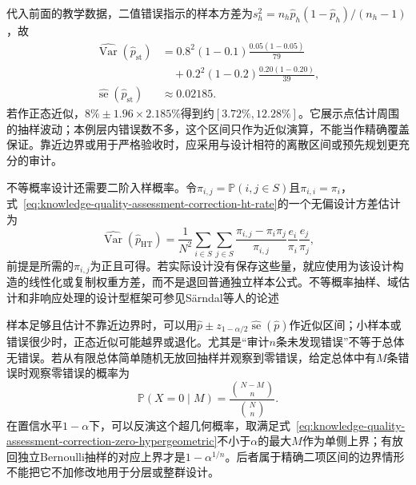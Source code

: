 代入前面的教学数据，二值错误指示的样本方差为$s_h^2=n_h\widehat p_h(1-\widehat p_h)/(n_h-1)$，故
\[
  \begin{aligned}
    \widehat{\operatorname{Var}}(\widehat p_{\mathrm{st}})
    &=
    0.8^2(1-0.1)\frac{0.05(1-0.05)}{79}\\
    &\quad+0.2^2(1-0.2)\frac{0.20(1-0.20)}{39},\\
    \widehat{\operatorname{se}}(\widehat p_{\mathrm{st}})
    &\approx 0.02185.
  \end{aligned}
\]
若作正态近似，$8\%\pm1.96\times2.185\%$得到约$[3.72\%,12.28\%]$。它展示点估计周围的抽样波动；本例层内错误数不多，这个区间只作为近似演算，不能当作精确覆盖保证。靠近边界或用于严格验收时，应采用与设计相符的离散区间或预先规划更充分的审计。

不等概率设计还需要二阶入样概率。令$\pi_{i,j}=\mathbb{P}(i,j\in S)$且$\pi_{i,i}=\pi_i$，式~\eqref{eq:knowledge-quality-assessment-correction-ht-rate}的一个无偏设计方差估计为
\begin{equation}
  \widehat{\operatorname{Var}}(\widehat p_{\mathrm{HT}})
  =
  \frac{1}{N^2}
  \sum_{i\in S}\sum_{j\in S}
  \frac{\pi_{i,j}-\pi_i\pi_j}{\pi_{i,j}}
  \frac{e_i}{\pi_i}\frac{e_j}{\pi_j},
  \label{eq:knowledge-quality-assessment-correction-ht-variance}
\end{equation}
前提是所需的$\pi_{i,j}$为正且可得。若实际设计没有保存这些量，就应使用为该设计构造的线性化或复制权重方差，而不是退回普通独立样本公式。不等概率抽样、域估计和非响应处理的设计型框架可参见Särndal等人的论述

样本足够且估计不靠近边界时，可以用$\widehat p\pm z_{1-\alpha/2}\widehat{\operatorname{se}}(\widehat p)$作近似区间；小样本或错误很少时，正态近似可能越界或退化。尤其是“审计$n$条未发现错误”不等于总体无错误。若从有限总体简单随机无放回抽样并观察到零错误，给定总体中有$M$条错误时观察零错误的概率为
\begin{equation}
  \mathbb{P}(X=0\mid M)
  =
  \frac{\binom{N-M}{n}}{\binom{N}{n}}.
  \label{eq:knowledge-quality-assessment-correction-zero-hypergeometric}
\end{equation}
在置信水平$1-\alpha$下，可以反演这个超几何概率，取满足式~\eqref{eq:knowledge-quality-assessment-correction-zero-hypergeometric}不小于$\alpha$的最大$M$作为单侧上界；有放回独立Bernoulli抽样的对应上界才是$1-\alpha^{1/n}$。后者属于精确二项区间的边界情形 不能把它不加修改地用于分层或整群设计。

